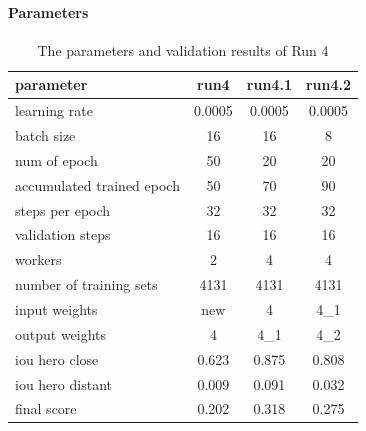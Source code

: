 \documentclass[paper=a4, fontsize=11pt]{scrartcl} %
\numberwithin{equation}{section} %
\numberwithin{figure}{section} %
\numberwithin{table}{section} %
\begin{document}
\paragraph{Parameters}\label{rubric23}
\begin{table}
	\begin{center}
		\begin{tabular}{ l | c | c | c }
		\hline
		parameter & run4 & run4.1 & run4.2 \\ \hline
		learning rate & 0.0005 & 0.0005 & 0.0005 \\ \hline
		batch size    & 16 & 16 & 8\\ \hline
		num of epoch  & 50 & 20 & 20\\ \hline
		accumulated trained epoch & 50 & 70 & 90\\ \hline
		steps per epoch & 32 & 32  & 32\\ \hline
		validation steps & 16 & 16 & 16\\ \hline
		workers & 2 & 4 & 4\\ \hline
		number of training sets & 4131 & 4131 & 4131\\ \hline
		input weights & new & 4 & 4\_1 \\ \hline
		output weights & 4 & 4\_1 & 4\_2\\ 		
		
		\hline \hline
		iou hero close & 0.623 & 0.875 & 0.808\\ \hline	  
		iou hero distant & 0.009 & 0.091 & 0.032\\ \hline
		final score & 0.202 & 0.318 & 0.275\\
		\hline
		\end{tabular}
		\caption{The parameters and validation results of Run 4}
		\label{tab:parameters4}
	\end{center}
\end{table}
\end{document}
